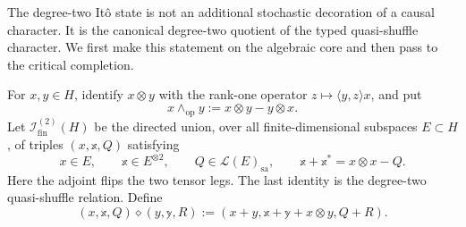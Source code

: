\documentclass[10pt,reqno]{amsart}
\theoremstyle{plain}
\theoremstyle{definition}
\theoremstyle{remark}
\begin{document}
The degree-two It\^o state is not an additional stochastic decoration of a
causal character.  It is the canonical degree-two quotient of the typed
quasi-shuffle character.  We first make this statement on the algebraic core
and then pass to the critical completion.

For \(x,y\in H\), identify \(x\otimes y\) with the rank-one operator
\(z\mapsto\langle y,z\rangle x\), and put
\[
 x\wedge_{\mathrm{op}}y:=x\otimes y-y\otimes x.
\]
Let \(\mathscr I^{(2)}_{\mathrm{fin}}(H)\) be the directed union, over all
finite-dimensional subspaces \(E\subset H\), of triples
\((x,\mathbb x,Q)\) satisfying
\[
 x\in E,\qquad
 \mathbb x\in E^{\otimes 2},\qquad
 Q\in\mathcal L(E)_{\mathrm{sa}},\qquad
 \mathbb x+\mathbb x^*=x\otimes x-Q.
\]
Here the adjoint flips the two tensor legs.  The last identity is the
degree-two quasi-shuffle relation.  Define
\begin{equation}
 (x,\mathbb x,Q)\diamond(y,\mathbb y,R)
 :=(x+y,\mathbb x+\mathbb y+x\otimes y,Q+R).
 \label{cc:eq-ito-two-product}
\end{equation}
\end{document}

